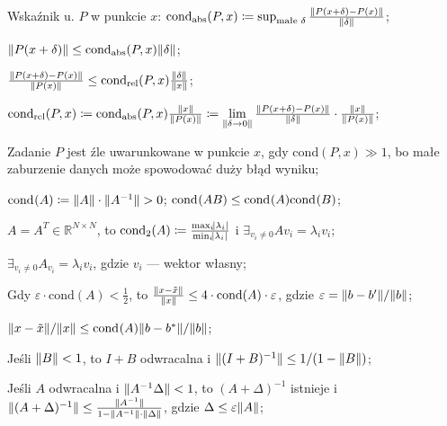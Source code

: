 
\entry
Wskaźnik u. $P$ w punkcie $x$:
$\mathrm{cond}_{\mathrm{abs}}(P,x) \coloneqq \sup_{\text{małe }\delta} \frac{\|P(x+\delta) - P(x)\|}{\|\delta\|}$;

\entry
$\|P(x+\delta)\| \leq \mathrm{cond}_{\mathrm{abs}}(P,x)\|\delta\|$;

\entry
$\frac{\|P(x+\delta) - P(x)\|}{\|P(x)\|} \leq \mathrm{cond}_{\mathrm{rel}}(P,x)\frac{\|\delta\|}{\|x\|}$;


\entry
$
\mathrm{cond}_{\mathrm{rel}}(P,x) \coloneqq
\mathrm{cond}_{\mathrm{abs}}(P,x) \frac{\|x\|}{\|P(x)\|}  \coloneqq
\lim\limits_{\|\delta \to 0\|} \frac{\|P(x+\delta) - P(x)\|}{\|\delta\|} \cdot \frac{\|x\|}{\|P(x)\|}
$;

\entry
Zadanie $P$ jest źle uwarunkowane w punkcie $x$,
gdy $\mathrm{cond}(P,x) \gg 1$,
bo małe zaburzenie danych może spowodować duży błąd wyniku;

\entry
$\cond{A} \coloneqq \norm{\vphantom{A^{-1}}A}\cdot\norm{A^{-1}} > 0$;
\entry
$\mathrm{cond}_{}(AB) \leq \mathrm{cond}_{}(A)\mathrm{cond}_{}(B)$;

\entry
$A=A^T\in\mathbb{R}^{N\times N}$,
to
$\mathrm{cond}_2(A)\coloneqq \frac{\max_i\abs{\lambda_i}}{\min_i\abs{\lambda_i}}$
i
$\exists_{v_i\neq 0} Av_i=\lambda_i v_i$;

\entry
$\exists_{v_i\neq 0} A_{v_i} = \lambda_i v_i$,
gdzie $v_i$ --- wektor własny;

\entry
Gdy
$\varepsilon\cdot\mathrm{cond}(A) < \frac{1}{2}$,
to $\frac{\|x - \tilde{x}\|}{\|x\|} \leq 4 \cdot \mathrm{cond}(A) \cdot \varepsilon$,
gdzie $\varepsilon=\|b-b'\| / \|b\|$;

\entry
$\|x - \tilde{x}\| / \|x\| \leq \mathrm{cond}_{}(A) \|b - b^{*}\| / \|b\|$;

\entry
Jeśli $\|B\| < 1$,
to $I+B$ odwracalna i $\|(I+B)^{-1}\| \leq 1 / (1 - \|B\|)$;

\entry
Jeśli $A$ odwracalna i $\|A^{-1}\Delta\| < 1$,
to $(A+\Delta)^{-1}$ istnieje
i $\|(A+\Delta)^{-1}\| \leq \frac{\|A^{-1}\|}{1 - \|A^{-1}\| \cdot \|\vphantom{A^1}\Delta\|}$,
gdzie $\Delta \leq \varepsilon\|A\|$;

